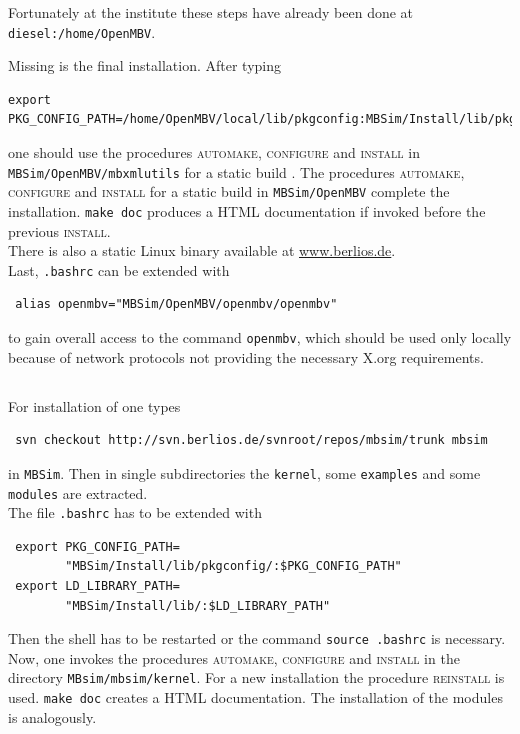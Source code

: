 {\small Fortunately at the institute these steps have already been done at \texttt{diesel:/home/OpenMBV}.}\par
Missing is the final installation. After typing
\begin{verbatim}
export PKG_CONFIG_PATH=/home/OpenMBV/local/lib/pkgconfig:MBSim/Install/lib/pkgconfig
\end{verbatim} 
one should use the procedures \textsc{automake, configure} and \textsc{install} in \texttt{MBSim/OpenMBV/mbxmlutils} for a static build . The procedures \textsc{automake, configure} and \textsc{install} for a static build in \texttt{MBSim/OpenMBV} complete the installation. \texttt{make doc} produces a HTML documentation if invoked before the previous \textsc{install}.\\
There is also a static Linux binary available at \url{www.berlios.de}.\\
Last, \texttt{.bashrc} can be extended with
\begin{verbatim}
 alias openmbv="MBSim/OpenMBV/openmbv/openmbv"
\end{verbatim}
to gain overall access to the command \texttt{openmbv}, which should be used only locally because of network protocols not providing the necessary X.org requirements.

\subsection{\MBSim}
For installation of \MBSim{} one types
\begin{verbatim}
 svn checkout http://svn.berlios.de/svnroot/repos/mbsim/trunk mbsim
\end{verbatim}
in \texttt{MBSim}. Then in single subdirectories the \texttt{kernel}, some \texttt{examples} and some \texttt{modules} are extracted.\\
The file \texttt{.bashrc} has to be extended with
\begin{verbatim}
 export PKG_CONFIG_PATH=
        "MBSim/Install/lib/pkgconfig/:$PKG_CONFIG_PATH"
 export LD_LIBRARY_PATH=
        "MBSim/Install/lib/:$LD_LIBRARY_PATH"
\end{verbatim}
Then the shell has to be restarted or the command \texttt{source .bashrc} is necessary.\\
Now, one invokes the procedures \textsc{automake, configure} and \textsc{install} in the directory \texttt{MBsim/mbsim/kernel}. For a new installation the procedure \textsc{reinstall} is used. \texttt{make doc} creates a HTML documentation. The installation of the modules is analogously.

